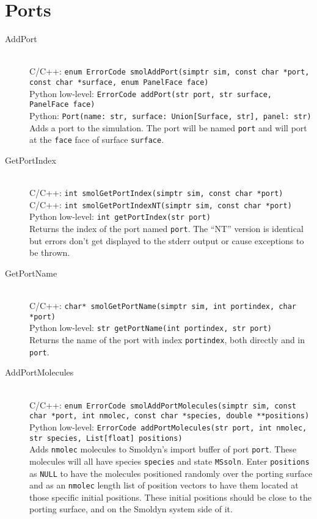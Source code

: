 \documentclass {book}
\newcommand {\ttt} {\texttt}
\begin{document}
\section{Ports}

\begin{description}

\item[AddPort]
\hfill \\
C/C++: \ttt{enum ErrorCode smolAddPort(simptr sim, const char *port, const char *surface, enum PanelFace face)}\\
Python low-level: \ttt{ErrorCode addPort(str port, str surface, PanelFace face)}\\
Python: \ttt{Port(name: str, surface: Union[Surface, str], panel: str)}\\
Adds a port to the simulation. The port will be named \ttt{port} and will port at the \ttt{face} face of surface \ttt{surface}.

\item[GetPortIndex]
\hfill \\
C/C++: \ttt{int smolGetPortIndex(simptr sim, const char *port)}\\
C/C++: \ttt{int smolGetPortIndexNT(simptr sim, const char *port)}\\
Python low-level: \ttt{int getPortIndex(str port)}\\
Returns the index of the port named \ttt{port}. The ``NT'' version is identical but errors don't get displayed to the stderr output or cause exceptions to be thrown.

\item[GetPortName]
\hfill \\
C/C++: \ttt{char* smolGetPortName(simptr sim, int portindex, char *port)}\\
Python low-level: \ttt{str getPortName(int portindex, str port)}\\
Returns the name of the port with index \ttt{portindex}, both directly and in \ttt{port}.

\item[AddPortMolecules]
\hfill \\
C/C++: \ttt{enum ErrorCode smolAddPortMolecules(simptr sim, const char *port, int nmolec, const char *species, double **positions)}\\
Python low-level: \ttt{ErrorCode addPortMolecules(str port, int nmolec, str species, List[float] positions)}\\
Adds \ttt{nmolec} molecules to Smoldyn's import buffer of port \ttt{port}. These molecules will all have species \ttt{species} and state \ttt{MSsoln}. Enter \ttt{positions} as \ttt{NULL} to have the molecules positioned randomly over the porting surface and as an \ttt{nmolec} length list of position vectors to have them located at those specific initial positions. These initial positions should be close to the porting surface, and on the Smoldyn system side of it.


\end{description}
\end{document}
